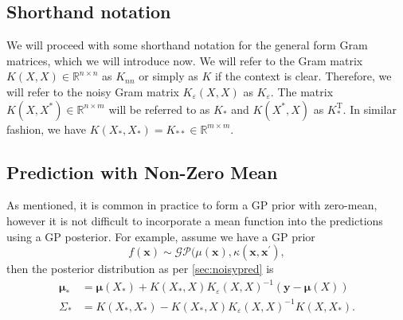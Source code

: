 \documentclass[10pt,a4paper]{article}
\numberwithin{equation}{section}
\theoremstyle{plain}
\theoremstyle{definition}
\theoremstyle{own}
\begin{document}
\subsection{Shorthand notation}
We will proceed with some shorthand notation for the general form Gram matrices, which we will introduce now. We will refer to the Gram matrix $K(X,X) \in \mathbb{R}^{n \times n}$ as $K_{nn}$ or simply as $K$ if the context is clear. Therefore, we will refer to the noisy Gram matrix $K_\varepsilon(X,X)$ as $K_\varepsilon$. The matrix $K(X,X^*) \in \mathbb{R}^{n \times m}$ will be referred to as $K_*$ and $K(X^*, X)$ as $K_*^{\text{T}}$. In similar fashion, we have $K(X_*, X_*) = K_{**} \in \mathbb{R}^{m\times m}$.
\subsection{Prediction with Non-Zero Mean}
As mentioned, it is common in practice to form a GP prior with zero-mean, however it is not difficult to incorporate a mean function into the predictions using a GP posterior. For example, assume we have a GP prior
\begin{equation}
f(\mathbf{x}) \sim \mathcal{GP}(\mu(\mathbf{x}), \kappa(\mathbf{x}, \mathbf{x}^{\prime}),
\end{equation}
then the posterior distribution as per \ref{sec:noisypred} is
\begin{align}
\boldsymbol\mu_* & = \boldsymbol\mu(X_*) + K(X_*, X) K_\varepsilon(X, X)^{-1} ( \mathbf{y} - \boldsymbol\mu(X) ) \\
\Sigma_* & = K(X_*, X_*) - K(X_*, X) K_\varepsilon(X, X)^{-1}K(X, X_*).
\end{align}
\end{document}
